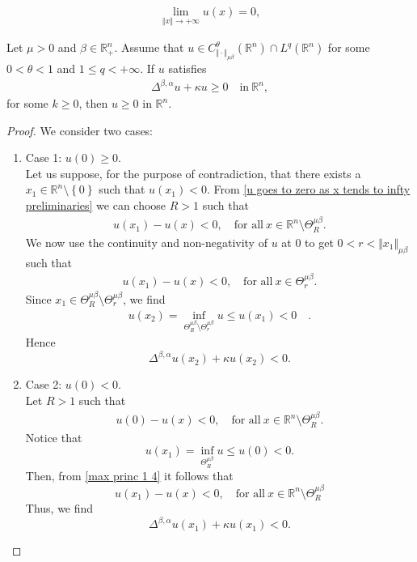 \documentclass[10pt,a4paper]{amsart}
\begin{document}
\begin{eqnarray}
\label{u goes to zero as x tends to infty preliminaries}
\lim_{\Vert x \Vert \rightarrow +\infty } u(x) = 0,
\end{eqnarray}

\begin{corollary}
\label{max princ 1}
Let $\mu >0$ and $\beta \in \mathbb{R}^{n}_{+}$. Assume that $u \in C^{\theta}_{\Vert \cdot \Vert_{\mu \beta}}\left(\mathbb{R}^{n}\right) \cap L^{q}\left(\mathbb{R}^{n}\right)$ for some $0 < \theta < 1$ and $1 \leq q < +\infty$. If $u$ satisfies
\begin{eqnarray}
\Delta^{\beta, \alpha} u + \kappa u \geq 0 \quad \text{in} \ \mathbb{R}^{n},
\end{eqnarray}
for some $k \geq 0$, then $u \geq 0$ in $\mathbb{R}^{n}$.
\end{corollary}

\begin{proof}
We consider two cases:
\begin{enumerate}
\item Case 1: $u(0) \geq  0$. \\
Let us suppose, for the purpose of contradiction, that there exists a $x_{1} \in \mathbb{R}^{n} \setminus \left\lbrace 0 \right\rbrace$ such that $u(x_{1}) < 0$. From \eqref{u goes to zero as x tends to infty preliminaries} we can choose $R > 1$ such that
\begin{eqnarray}
\label{max princ 1 1}
u(x_{1}) - u(x) < 0, \quad \text{for all} \ x \in \mathbb{R}^{n} \setminus \Theta^{\mu \beta}_{R}.
\end{eqnarray}
We now use the continuity and non-negativity of $u$ at $0$ to get $0 < r < \Vert x_{1} \Vert_{\mu \beta }$ such that
\begin{eqnarray}
\label{max princ 1 2}
u(x_{1}) - u(x) < 0, \quad \text{for all} \ x \in \Theta^{\mu \beta}_{r}.
\end{eqnarray}
Since $x_{1} \in \Theta^{\mu \beta}_{R} \setminus \Theta^{\mu \beta}_{r}$, we find
\begin{eqnarray}
\label{max princ 1 3}
u(x_{2}) = \inf_{\Theta^{\mu \beta}_{R} \setminus \Theta^{\mu \beta}_{r}} u \leq u(x_{1}) < 0 \quad .
\end{eqnarray}
Hence
$$
\Delta^{\beta, \alpha} u(x_{2}) + \kappa u(x_{2}) < 0.
$$
\item Case 2: $u(0) <0 $. \\
Let $R > 1$ such that
\begin{eqnarray}
\label{max princ 1 4}
u(0) - u(x) < 0, \quad \text{for all} \ x \in \mathbb{R}^{n} \setminus \Theta^{\mu \beta}_{R}.
\end{eqnarray}
Notice that
$$u(x_{1}) = \inf_{\Theta^{\mu \beta}_{R}} u \leq u(0) < 0.$$
Then, from \eqref{max princ 1 4} it follows that
$$
u(x_{1}) - u(x) < 0, \quad \text{for all} \ x \in \mathbb{R}^{n} \setminus \Theta^{\mu \beta}_{R}
$$
Thus, we find
$$
\Delta^{\beta, \alpha} u(x_{1}) + \kappa u(x_{1}) < 0.
$$
\end{enumerate}
\end{proof}
\end{document}
